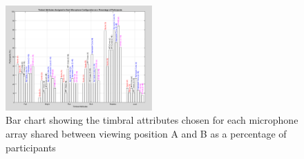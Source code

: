 	\begin{figure}
		\includegraphics[width=0.5\textwidth]{images/plots/bar_sharedMics.PNG}
		\caption{Bar chart showing the timbral attributes chosen for each microphone array shared between viewing position A and B as a percentage of participants}
		\label{image:ta_sharedmics} 
	\end{figure}	


